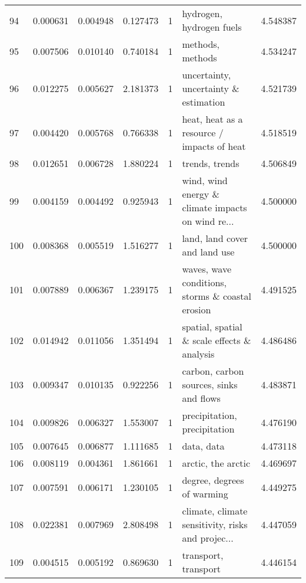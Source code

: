 \begin{tabular}{lrrrrlr}
94  &    0.000631 &  0.004948 &        0.127473 &           1 &                           hydrogen, hydrogen fuels &  4.548387 \\
95  &    0.007506 &  0.010140 &        0.740184 &           1 &                                   methods, methods &  4.534247 \\
96  &    0.012275 &  0.005627 &        2.181373 &           1 &              uncertainty, uncertainty \& estimation &  4.521739 \\
97  &    0.004420 &  0.005768 &        0.766338 &           1 &         heat, heat as a resource / impacts of heat &  4.518519 \\
98  &    0.012651 &  0.006728 &        1.880224 &           1 &                                     trends, trends &  4.506849 \\
99  &    0.004159 &  0.004492 &        0.925943 &           1 &  wind, wind energy \& climate impacts on wind re... &  4.500000 \\
100 &    0.008368 &  0.005519 &        1.516277 &           1 &                      land, land cover and land use &  4.500000 \\
101 &    0.007889 &  0.006367 &        1.239175 &           1 &   waves, wave conditions, storms \& coastal erosion &  4.491525 \\
102 &    0.014942 &  0.011056 &        1.351494 &           1 &        spatial, spatial \& scale effects \& analysis &  4.486486 \\
103 &    0.009347 &  0.010135 &        0.922256 &           1 &            carbon, carbon sources, sinks and flows &  4.483871 \\
104 &    0.009826 &  0.006327 &        1.553007 &           1 &                       precipitation, precipitation &  4.476190 \\
105 &    0.007645 &  0.006877 &        1.111685 &           1 &                                         data, data &  4.473118 \\
106 &    0.008119 &  0.004361 &        1.861661 &           1 &                                 arctic, the arctic &  4.469697 \\
107 &    0.007591 &  0.006171 &        1.230105 &           1 &                         degree, degrees of warming &  4.449275 \\
108 &    0.022381 &  0.007969 &        2.808498 &           1 &  climate, climate sensitivity, risks and projec... &  4.447059 \\
109 &    0.004515 &  0.005192 &        0.869630 &           1 &                               transport, transport &  4.446154 \\

\end{tabular}
